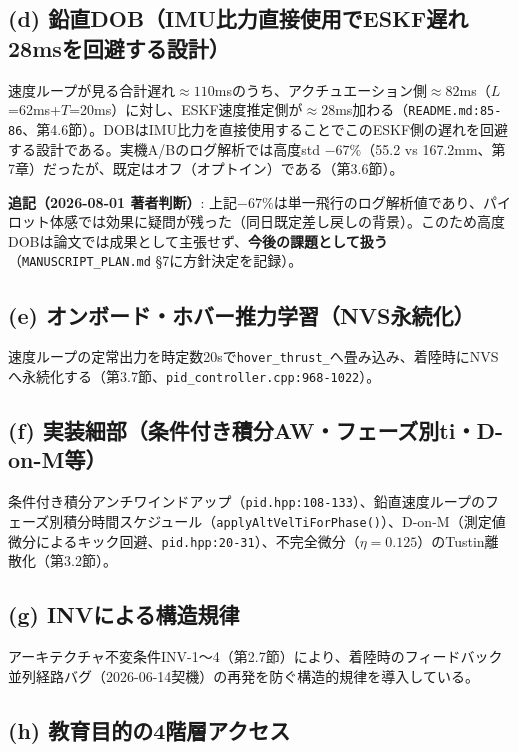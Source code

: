 \documentclass[a4paper,10pt]{ltjsarticle}
\begin{document}
\subsection{(d) 鉛直DOB（IMU比力直接使用でESKF遅れ28msを回避する設計）}

速度ループが見る合計遅れ$\approx110$msのうち、アクチュエーション側$\approx82$ms（$L$=62ms+$T$=20ms）に対し、ESKF速度推定側が$\approx28$ms加わる（\texttt{README.md:85-86}、第4.6節）。DOBはIMU比力を直接使用することでこのESKF側の遅れを回避する設計である。実機A/Bのログ解析では高度std $-67\%$（55.2 vs 167.2mm、第7章）だったが、既定はオフ（オプトイン）である（第3.6節）。

\textbf{追記（2026-08-01 著者判断）}: 上記$-67\%$は単一飛行のログ解析値であり、パイロット体感では効果に疑問が残った（同日既定差し戻しの背景）。このため高度DOBは論文では成果として主張せず、\textbf{今後の課題として扱う}（\texttt{MANUSCRIPT\_PLAN.md} §7に方針決定を記録）。

\subsection{(e) オンボード・ホバー推力学習（NVS永続化）}

速度ループの定常出力を時定数20sで\texttt{hover\_thrust\_}へ畳み込み、着陸時にNVSへ永続化する（第3.7節、\texttt{pid\_controller.cpp:968-1022}）。

\subsection{(f) 実装細部（条件付き積分AW・フェーズ別ti・D-on-M等）}

条件付き積分アンチワインドアップ（\texttt{pid.hpp:108-133}）、鉛直速度ループのフェーズ別積分時間スケジュール（\texttt{applyAltVelTiForPhase()}）、D-on-M（測定値微分によるキック回避、\texttt{pid.hpp:20-31}）、不完全微分（$\eta=0.125$）のTustin離散化（第3.2節）。

\subsection{(g) INVによる構造規律}

アーキテクチャ不変条件INV-1〜4（第2.7節）により、着陸時のフィードバック並列経路バグ（2026-06-14契機）の再発を防ぐ構造的規律を導入している。

\subsection{(h) 教育目的の4階層アクセス}
\end{document}

